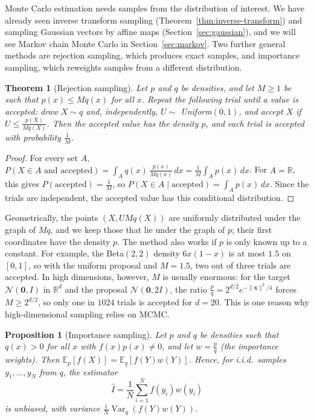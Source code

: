 \documentclass[11pt]{article}
\newcommand{\norm}[1]{\lVert #1 \rVert}
\newcommand{\E}{\mathbb{E}}
\DeclareMathOperator{\Var}{Var}
\theoremstyle{definition}
\theoremstyle{plain}
\newtheorem{theorem}[definition]{Theorem}
\newtheorem{proposition}[definition]{Proposition}
\theoremstyle{remark}
\begin{document}
Monte Carlo estimation needs samples from the distribution of interest. We have already seen inverse transform sampling (Theorem~\ref{thm:inverse-transform}) and sampling Gaussian vectors by affine maps (Section~\ref{sec:gaussian}), and we will see Markov chain Monte Carlo in Section~\ref{sec:markov}. Two further general methods are rejection sampling, which produces exact samples, and importance sampling, which reweights samples from a different distribution.

\begin{theorem}[Rejection sampling]\label{thm:rejection}
    Let $p$ and $q$ be densities, and let $M \geq 1$ be such that $p(x) \leq Mq(x)$ for all $x$. Repeat the following trial until a value is accepted: draw $X \sim q$ and, independently, $U \sim$ Uniform$(0, 1)$, and accept $X$ if $U \leq \frac{p(X)}{Mq(X)}$. Then the accepted value has the density $p$, and each trial is accepted with probability $\frac{1}{M}$.
\end{theorem}

\begin{proof}
    For every set $A$, $P(X \in A \text{ and accepted}) = \int_A q(x)\,\frac{p(x)}{Mq(x)}\, dx = \frac{1}{M}\int_A p(x)\, dx$. For $A = \mathbb{R}$, this gives $P(\text{accepted}) = \frac{1}{M}$, so $P(X \in A \mid \text{accepted}) = \int_A p(x)\, dx$. Since the trials are independent, the accepted value has this conditional distribution.
\end{proof}

Geometrically, the points $(X, UMq(X))$ are uniformly distributed under the graph of $Mq$, and we keep those that lie under the graph of $p$; their first coordinates have the density $p$. The method also works if $p$ is only known up to a constant. For example, the Beta$(2, 2)$ density $6x(1 - x)$ is at most $1.5$ on $[0, 1]$, so with the uniform proposal and $M = 1.5$, two out of three trials are accepted. In high dimensions, however, $M$ is usually enormous: for the target $\mathcal{N}(\mathbf{0}, I)$ in $\mathbb{R}^d$ and the proposal $\mathcal{N}(\mathbf{0}, 2I)$, the ratio $\frac{p}{q} = 2^{d/2}e^{-\norm{\mathbf{x}}^2/4}$ forces $M \geq 2^{d/2}$, so only one in $1024$ trials is accepted for $d = 20$. This is one reason why high-dimensional sampling relies on MCMC.

\begin{proposition}[Importance sampling]\label{prop:importance}
    Let $p$ and $q$ be densities such that $q(x) > 0$ for all $x$ with $f(x)p(x) \neq 0$, and let $w = \frac{p}{q}$ (the importance weights). Then $\E_p[f(X)] = \E_q[f(Y)w(Y)]$. Hence, for i.i.d.\ samples $y_1, \ldots, y_N$ from $q$, the estimator
    \[\hat I = \frac{1}{N}\sum_{i=1}^N f(y_i)w(y_i)\]
    is unbiased, with variance $\frac{1}{N}\Var_q(f(Y)w(Y))$.
\end{proposition}
\end{document}

